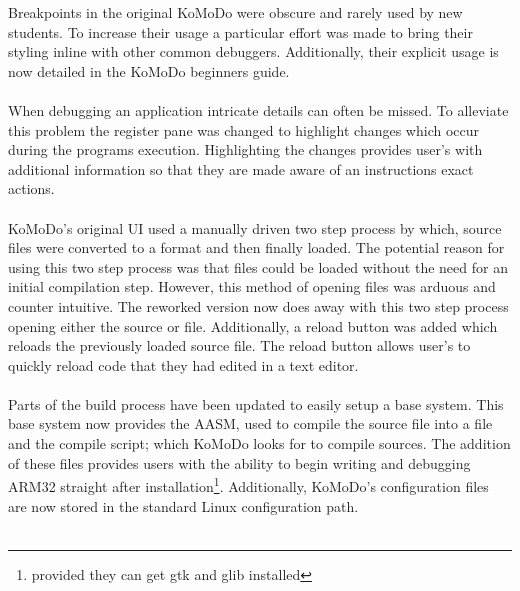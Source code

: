   Breakpoints in the original KoMoDo were obscure and rarely used by new students. To increase their usage a particular effort was made to bring their styling inline with other common debuggers. Additionally, their explicit usage is now detailed in the KoMoDo beginners guide.\\\\
  When debugging an application intricate details can often be missed. To alleviate this problem the register pane was changed to highlight changes which occur during the programs execution. Highlighting the changes provides user's with additional information so that they are made aware of an instructions exact actions.\\\\
  KoMoDo's original UI used a manually driven two step process by which, source files were converted to a  format and then finally loaded. The potential reason for using this two step process was that  files could be loaded without the need for an initial compilation step. However, this method of opening files was arduous and counter intuitive. The reworked version now does away with this two step process opening either the source or  file. Additionally, a reload button was added which reloads the previously loaded source file. The reload button allows user's to quickly reload code that they had edited in a text editor.\\\\
  Parts of the build process have been updated to easily setup a base system. This base system now provides the AASM, used to compile the source file into a  file and the compile script; which KoMoDo looks for to compile sources. The addition of these files provides users with the ability to begin writing and debugging ARM32 straight after installation\footnote{provided they can get gtk and glib installed}. Additionally, KoMoDo's configuration files are now stored in the standard Linux configuration path.\\\\
